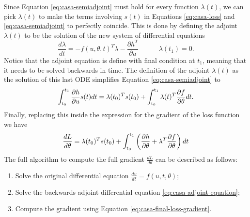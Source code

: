 Since Equation \eqref{eq:casa-semiadjoint} must hold for every function $\lambda(t)$, we can pick $\lambda(t)$ to make the terms involving $s(t)$ in Equations \eqref{eq:casa-loss} and \eqref{eq:casa-semiadjoint} to perfectly coincide. 
This is done by defining the adjoint $\lambda(t)$ to be the solution of the new system of differential equations
\begin{equation}
    \frac{d\lambda}{dt} 
    = 
    - 
    f(u, \theta, t)^T \lambda  
    - 
    \frac{\partial h^T}{\partial u} 
    \qquad \quad \lambda(t_1) = 0. 
    \label{eq:casa-adjoint-equation}
\end{equation}
Notice that the adjoint equation is define with final condition at $t_1$, meaning that it needs to be solved backwards in time. 
The definition of the adjoint $\lambda(t)$ as the solution of this last ODE simplifies Equation \eqref{eq:casa-semiadjoint} to
\begin{equation}
    \operatorname{\int_{t_0}^{t_1}} \frac{\partial h}{\partial u} s(t) dt
    = 
    \lambda(t_0)^T s(t_0)
    + 
    \operatorname{\int_{t_0}^{t_1}} \lambda(t)^T \frac{\partial f}{\partial \theta} dt.
\end{equation}
Finally, replacing this inside the expression for the gradient of the loss function we have 
\begin{equation}
    \frac{dL}{d\theta}
    = 
    \lambda(t_0)^T s(t_0)
    + 
    \operatorname{\int_{t_0}^{t_1}}
    \left( \frac{\partial h}{\partial \theta} + \lambda^T \frac{\partial f}{\partial \theta} \right) dt
    \label{eq:casa-final-loss-gradient}
\end{equation}
The full algorithm to compute the full gradient $\frac{dL}{d\theta}$ can be described as follows:
\begin{enumerate}
    \item Solve the original differential equation $\frac{du}{dt} = f(u, t, \theta)$;
    \item Solve the backwards adjoint differential equation \eqref{eq:casa-adjoint-equation};
    \item Compute the gradient using Equation \eqref{eq:casa-final-loss-gradient}.
\end{enumerate}
